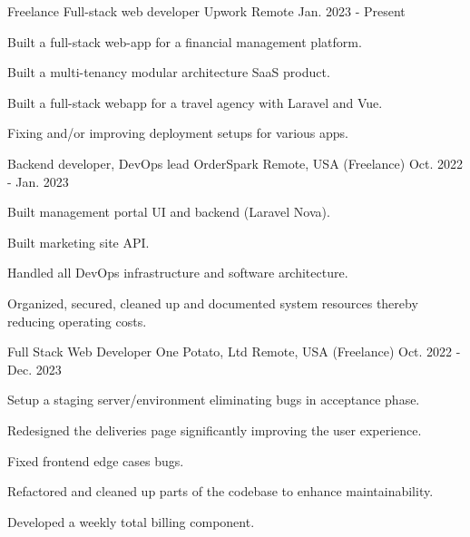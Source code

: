 \begin{cventries}
  \cventry
    {Freelance Full-stack web developer} %
    {Upwork} %
    {Remote} %
    {Jan. 2023 - Present} %
    {
      \begin{cvitems} %
        \item {Built a full-stack web-app for a financial management platform.}
        \item {Built a multi-tenancy modular architecture SaaS product.}
        \item {Built a full-stack webapp for a travel agency with Laravel and Vue.}
        \item {Fixing and/or improving deployment setups for various apps.}
      \end{cvitems}
    }

  \cventry
    {Backend developer, DevOps lead} %
    {OrderSpark} %
    {Remote, USA (Freelance)} %
    {Oct. 2022 - Jan. 2023} %
    {
      \begin{cvitems} %
        \item {Built management portal UI and backend (Laravel Nova).}
        \item {Built marketing site API.}
        \item {Handled all DevOps infrastructure and software architecture.}
        \item {Organized, secured, cleaned up and documented system resources thereby reducing operating costs.}
      \end{cvitems}
    }

  \cventry
    {Full Stack Web Developer} %
    {One Potato, Ltd} %
    {Remote, USA (Freelance)} %
    {Oct. 2022 - Dec. 2023} %
    {
      \begin{cvitems} %
        \item {Setup a staging server/environment eliminating bugs in acceptance phase.}
        \item {Redesigned the deliveries page significantly improving the user experience.}
        \item {Fixed frontend edge cases bugs.}
        \item {Refactored and cleaned up parts of the codebase to enhance maintainability.}
        \item {Developed a weekly total billing component.}
      \end{cvitems}
    }


\end{cventries}
